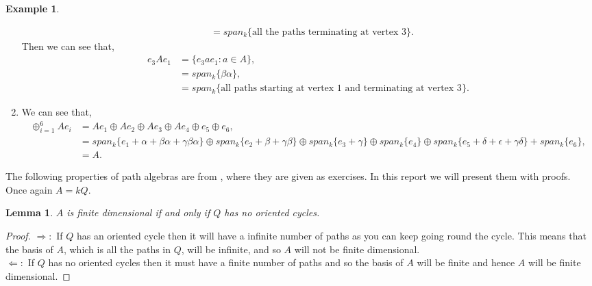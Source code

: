 \documentclass[11.5pt, twoside, a4paper, titlepage]{report}
\theoremstyle{definition}
\newtheorem{eg}[mydef]{Example}
\theoremstyle{plain}
\newtheorem{lem}[mydef]{Lemma}
\begin{document}
\begin{eg}
\begin{enumerate}
\begin{align*}
&=span_k\{ \text{all the paths terminating at vertex 3}\}.
\end{align*}
Then we can see that, 
\begin{align*}
e_3Ae_1&=\{e_3ae_1: a \in A\},\\
&= span_k\{\beta\alpha\},\\
&=span_k\{\text{all paths starting at vertex 1 and terminating at vertex 3}\}.
\end{align*}
\item We can see that, 
\begin{align*}
\oplus^6_{i=1}Ae_i&=Ae_1 \oplus Ae_2 \oplus Ae_3 \oplus Ae_4 \oplus e_5 \oplus e_6, \\
&=span_k\{e_1 + \alpha + \beta\alpha + \gamma\beta\alpha\} \oplus span_k\{e_2 + \beta +\gamma\beta\} \oplus span_k\{e_3 + \gamma\} \oplus span_k\{e_4\} \oplus span_k\{e_5 + \delta + \epsilon + \gamma\delta\} + span_k\{e_6\}, \\
&= A.
\end{align*}
\end{enumerate}
\end{eg}

The following properties of path algebras are from \cite{CB2}, where they are given as exercises. In this report we will present them with proofs. Once again $A=kQ$.

\begin{lem}
$A$ is finite dimensional if and only if $Q$ has no oriented cycles.
\end{lem}
\begin{proof}
$\Rightarrow:$ If $Q$ has an oriented cycle then it will have a infinite number of paths as you can keep going round the cycle. This means that the basis of $A$, which is all the paths in $Q$, will be infinite, and so $A$ will not be finite dimensional.\\
$\Leftarrow:$ If $Q$ has no oriented cycles then it must have a finite number of paths and so the basis of $A$ will be finite and hence $A$ will be finite dimensional.
\end{proof}
\end{document}
